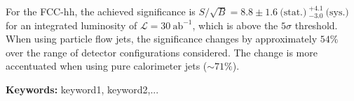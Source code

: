 For the FCC-hh, the achieved significance is $S/\sqrt{B}=8.8\pm 1.6~\text{(stat.)}~^{+4.1}_{-3.0}~\text{(sys.)}$ for an integrated luminosity of $\mathcal{L}=30~\text{ab}^{-1}$, which is above the $5\sigma$ threshold. When using particle flow jets, the significance changes by approximately $54\%$ over the range of detector configurations considered. The change is more accentuated when using pure calorimeter jets ($\sim 71\%$).

\vfill

\textbf{\Large Keywords:} keyword1, keyword2,...


